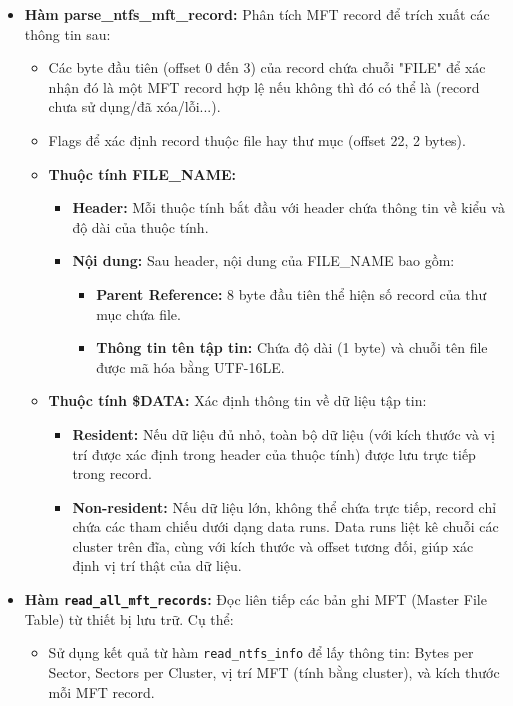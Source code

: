 \begin{itemize}
    \item \textbf{Hàm parse\_ntfs\_mft\_record:} Phân tích MFT record để trích xuất các thông tin sau:
    \begin{itemize}
        \item Các byte đầu tiên (offset 0 đến 3) của record chứa chuỗi "FILE" để xác nhận đó là một MFT record hợp lệ nếu không thì đó có thể là (record chưa sử dụng/đã xóa/lỗi...).
        \item Flags để xác định record thuộc file hay thư mục (offset 22, 2 bytes).
         \item \textbf{Thuộc tính FILE\_NAME:} 
    \begin{itemize}
        \item \textbf{Header:} Mỗi thuộc tính bắt đầu với header chứa thông tin về kiểu và độ dài của thuộc tính.
        \item \textbf{Nội dung:} Sau header, nội dung của FILE\_NAME bao gồm:
        \begin{itemize}
            \item \textbf{Parent Reference:} 8 byte đầu tiên thể hiện số record của thư mục chứa file.
            \item \textbf{Thông tin tên tập tin:} Chứa độ dài (1 byte) và chuỗi tên file được mã hóa bằng UTF-16LE.
        \end{itemize}
    \end{itemize}
    \item \textbf{Thuộc tính \$DATA:} Xác định thông tin về dữ liệu tập tin:
    \begin{itemize}
        \item \textbf{Resident:} Nếu dữ liệu đủ nhỏ, toàn bộ dữ liệu (với kích thước và vị trí được xác định trong header của thuộc tính) được lưu trực tiếp trong record.
        \item \textbf{Non-resident:} Nếu dữ liệu lớn, không thể chứa trực tiếp, record chỉ chứa các tham chiếu dưới dạng data runs. Data runs liệt kê chuỗi các cluster trên đĩa, cùng với kích thước và offset tương đối, giúp xác định vị trí thật của dữ liệu.
    \end{itemize}
    \end{itemize}
  \item \textbf{Hàm \texttt{read\_all\_mft\_records}:}  
Đọc liên tiếp các bản ghi MFT (Master File Table) từ thiết bị lưu trữ. Cụ thể:
\begin{itemize}
    \item Sử dụng kết quả từ hàm \texttt{read\_ntfs\_info} để lấy thông tin: Bytes per Sector, Sectors per Cluster, vị trí MFT (tính bằng cluster), và kích thước mỗi MFT record.

\end{itemize}
\end{itemize}
